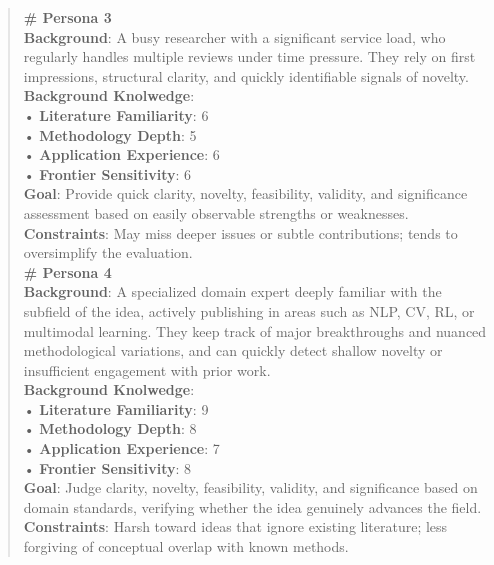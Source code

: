 \begin{quote}
\begin{tcolorbox}[breakable,colback=persona!20!white, colframe=persona!60!black, title=\textbf{Personas}]
        \textbf{\# Persona 3}\\
        \textbf{Background}: A busy researcher with a significant service load, who regularly handles multiple reviews under time pressure. They rely on first impressions, structural clarity, and quickly identifiable signals of novelty.\\
        \textbf{Background Knolwedge}:\\
        • \textbf{Literature Familiarity}: 6\\
        • \textbf{Methodology Depth}: 5\\
        • \textbf{Application Experience}: 6\\
        • \textbf{Frontier Sensitivity}: 6\\
        \textbf{Goal}: Provide quick clarity, novelty, feasibility, validity, and significance assessment based on easily observable strengths or weaknesses.\\
        \textbf{Constraints}: May miss deeper issues or subtle contributions; tends to oversimplify the evaluation.\\

        \textbf{\# Persona 4}\\
        \textbf{Background}: A specialized domain expert deeply familiar with the subfield of the idea, actively publishing in areas such as NLP, CV, RL, or multimodal learning. They keep track of major breakthroughs and nuanced methodological variations, and can quickly detect shallow novelty or insufficient engagement with prior work.\\
        \textbf{Background Knolwedge}:\\
        • \textbf{Literature Familiarity}: 9\\
        • \textbf{Methodology Depth}: 8\\
        • \textbf{Application Experience}: 7\\
        • \textbf{Frontier Sensitivity}: 8\\
        \textbf{Goal}: Judge clarity, novelty, feasibility, validity, and significance based on domain standards, verifying whether the idea genuinely advances the field.\\
        \textbf{Constraints}: Harsh toward ideas that ignore existing literature; less forgiving of conceptual overlap with known methods.\\


\end{tcolorbox}
\end{quote}
